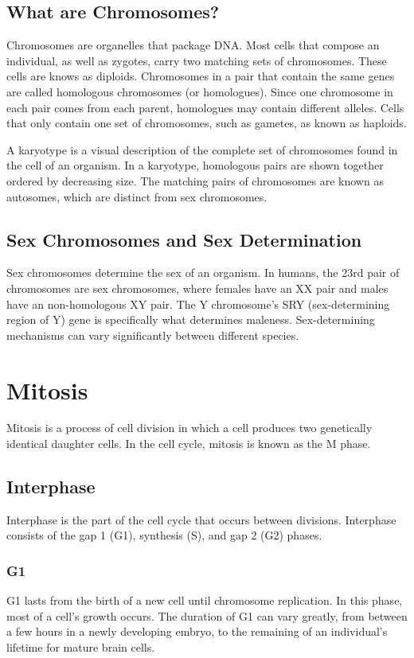 \documentclass[12pt,titlepage]{article}
\begin{document}
    \subsection{What are Chromosomes?}
      Chromosomes are organelles that package DNA. Most cells that compose an individual, as well as zygotes, carry two matching sets of chromosomes.
      These cells are knows as diploids. Chromosomes in a pair that contain the same genes are called homologous chromosomes (or homologues).
      Since one chromosome in each pair comes from each parent, homologues may contain different alleles. Cells that only contain one set of chromosomes,
      such as gametes, as known as haploids.

      A karyotype is a visual description of the complete set of chromosomes found in the cell of an organism. In a karyotype, homologous pairs are shown
      together ordered by decreasing size. The matching pairs of chromosomes are known as autosomes, which are distinct from sex chromosomes.

    \subsection{Sex Chromosomes and Sex Determination}
      Sex chromosomes determine the sex of an organism. In humans, the 23rd pair of chromosomes are sex chromosomes, where females have an XX pair and males have
      an non-homologous XY pair. The Y chromosome's SRY (sex-determining region of Y) gene is specifically what determines maleness. Sex-determining mechanisms
      can vary significantly between different species.

  \newpage

  \section{Mitosis}
    Mitosis is a process of cell division in which a cell produces two genetically identical daughter cells. In the cell cycle, mitosis is known as the M phase.

    \subsection{Interphase}
      Interphase is the part of the cell cycle that occurs between divisions. Interphase consists of the gap 1 (G1), synthesis (S), and gap 2 (G2) phases.

      \subsubsection{G1}
        G1 lasts from the birth of a new cell until chromosome replication. In this phase, most of a cell's growth occurs. The duration of G1 can vary greatly,
        from between a few hours in a newly developing embryo, to the remaining of an individual's lifetime for mature brain cells.
\end{document}
